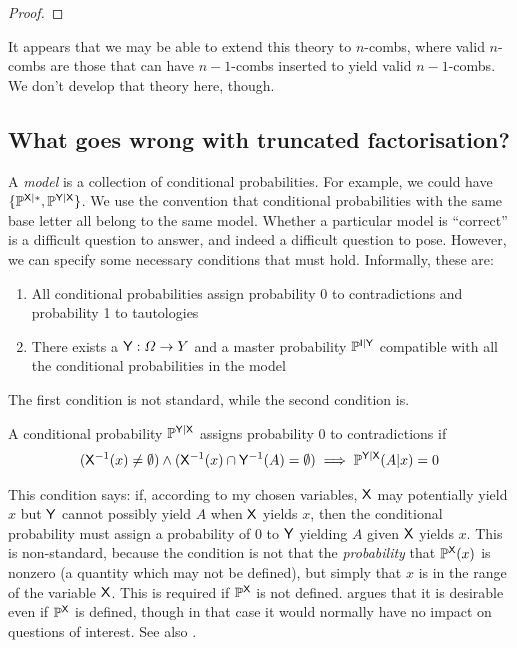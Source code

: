 \begin{proof}

\end{proof}

It appears that we may be able to extend this theory to $n$-combs, where valid $n$-combs are those that can have $n-1$-combs inserted to yield valid $n-1$-combs. We don't develop that theory here, though.

\subsection{What goes wrong with truncated factorisation?}

A \emph{model} is a collection of conditional probabilities. For example, we could have $\{\mathbb{P}^{\mathsf{X}|*},\mathbb{P}^{\mathsf{Y}|\mathsf{X}}\}$. We use the convention that conditional probabilities with the same base letter all belong to the same model. Whether a particular model is ``correct'' is a difficult question to answer, and indeed a difficult question to pose. However, we can specify some necessary conditions that must hold. Informally, these are:

\begin{enumerate}
	\item All conditional probabilities assign probability 0 to contradictions and probability 1 to tautologies
	\item There exists a $\mathsf{Y}:\Omega\to Y$ and a master probability $\mathbb{P}^{\mathsf{I}|\mathsf{Y}}$ compatible with all the conditional probabilities in the model
\end{enumerate}

The first condition is not standard, while the second condition is.

\begin{definition}\label{def:prob_0_contradiction}
A conditional probability $\mathbb{P}^{\mathsf{Y}|\mathsf{X}}$ assigns probability 0 to contradictions if 
\begin{align}
	(\mathsf{X}^{-1}(x)\neq \emptyset)\land (\mathsf{X}^{-1}(x)\cap \mathsf{Y}^{-1}(A) = \emptyset) \implies\mathbb{P}^{\mathsf{Y}|\mathsf{X}}(A|x) = 0
\end{align}
\end{definition}

This condition says: if, according to my chosen variables, $\mathsf{X}$ may potentially yield $x$ but $\mathsf{Y}$ cannot possibly yield $A$ when $\mathsf{X}$ yields $x$, then the conditional probability must assign a probability of 0 to $\mathsf{Y}$ yielding $A$ given $\mathsf{X}$ yields $x$. This is non-standard, because the condition is not that the \emph{probability} that $\mathbb{P}^{\mathsf{X}}(x)$ is nonzero (a quantity which may not be defined), but simply that $x$ is in the range of the variable $\mathsf{X}$. This is required if $\mathbb{P}^{\mathsf{X}}$ is not defined. \citet{hajek_what_2003} argues that it is desirable even if $\mathbb{P}^{\mathsf{X}}$ is defined, though in that case it would normally have no impact on questions of interest. See also \citet{renyi_conditional_1956}.

